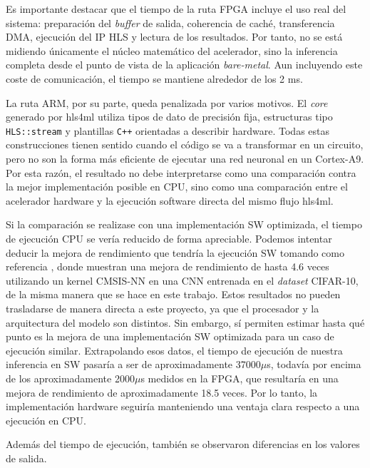 Es importante destacar que el tiempo de la ruta \ac{FPGA} incluye el uso real del
sistema: preparación
del \textit{buffer} de salida, coherencia de caché, transferencia \ac{DMA}, ejecución del
\ac{IP} \ac{HLS} y lectura de los
resultados. Por tanto, no se está midiendo únicamente el núcleo matemático del acelerador, sino la
inferencia completa desde el punto de vista de la aplicación \textit{bare-metal}. Aun
incluyendo este coste
de comunicación, el tiempo se mantiene alrededor de los 2 ms.

La ruta \ac{ARM}, por su parte, queda penalizada por varios motivos. El \textit{core}
generado por hls4ml utiliza
tipos de dato de precisión fija, estructuras tipo \texttt{\ac{HLS}::stream} y plantillas
\texttt{C++} orientadas a
describir hardware. Todas estas construcciones tienen sentido cuando el código se va a transformar
en un circuito, pero no son la forma más eficiente de ejecutar una red neuronal en un Cortex-A9.
Por esta razón, el resultado no debe interpretarse como una comparación contra la mejor
implementación posible en \ac{CPU}, sino como una comparación entre el acelerador hardware y la
ejecución software directa del mismo flujo hls4ml.

Si la comparación se realizase con una implementación \ac{SW} optimizada, el tiempo de
ejecución \ac{CPU}
se vería reducido de forma apreciable.
Podemos intentar deducir la mejora de rendimiento que tendría la ejecución \ac{SW} tomando como
referencia \citep{lai2018cmsisnnefficientneuralnetwork}, donde muestran una mejora de rendimiento
de hasta 4.6 veces utilizando un kernel CMSIS-NN \citep{cmsisnnRepo} en una \ac{CNN} entrenada
en el \textit{dataset} \ac{CIFAR}-10, de la misma manera que se hace en este trabajo.
Estos resultados no pueden trasladarse de manera directa a este proyecto, ya que el procesador y
la arquitectura del modelo son distintos.
Sin embargo, sí permiten estimar hasta qué punto es la mejora de una implementación
\ac{SW} optimizada
para un caso de ejecución similar.
Extrapolando esos datos, el tiempo de ejecución de nuestra inferencia en \ac{SW} pasaría a
ser de aproximadamente 37000$\mu$s, todavía por encima de los aproximadamente 2000$\mu$s medidos
en la \ac{FPGA}, que resultaría en una mejora de rendimiento de aproximadamente 18.5 veces.
Por lo tanto, la implementación hardware seguiría manteniendo una ventaja clara respecto a una
ejecución en \ac{CPU}.

Además del tiempo de ejecución, también se observaron diferencias en los valores de salida.

